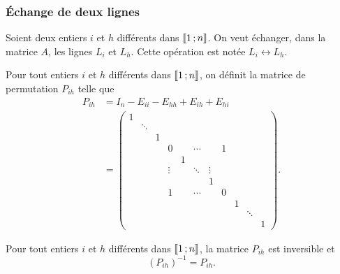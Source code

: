 \subsubsection{Échange de deux lignes}
Soient deux entiers \(i\) et \(h\) différents dans \(\mathopen{\llbracket}1\mathclose{}\mathpunct{};n\mathclose{\rrbracket}\).
On veut échanger, dans la matrice \(A\), les lignes \(L_i\) et \(L_h\). Cette
opération est notée \(L_i \leftrightarrow L_h\).
\begin{defdef}
  Pour tout entiers \(i\) et \(h\) différents dans \(\mathopen{\llbracket}1\mathclose{}\mathpunct{};n\mathclose{\rrbracket}\),
  on définit la matrice de permutation \(P_{ih}\) telle que
  \begin{align*}
    P_{ih} &= I_n - E_{ii}-E_{hh} +E_{ih}+E_{hi}\\
           & = 
           \begin{pmatrix}
             1&        &  &        &   &        &        &   &   &        & \\
              & \ddots &  &        &   &        &        &   &   &        & \\
              &        &1 &        &   &        &        &   &   &        & \\
              &        &  & 0      &   & \cdots &        & 1 &   &        & \\
              &        &  &        & 1 &        &        &   &   &        & \\
              &        &  & \vdots &   & \ddots & \vdots &   &   &        & \\
              &        &  &        &   &        & 1      &   &   &        & \\
              &        &  & 1      &   & \cdots &        & 0 &   &        & \\
              &        &  &        &   &        &        &   & 1 &        & \\
              &        &  &        &   &        &        &   &   & \ddots & \\
              &        &  &        &   &        &        &   &   &        & 1
           \end{pmatrix}.
  \end{align*}
\end{defdef}
%
\begin{prop}
  Pour tout entiers \(i\) et \(h\) différents dans \(\mathopen{\llbracket}1\mathclose{}\mathpunct{};n\mathclose{\rrbracket}\),
  la matrice \(P_{ih}\) est inversible et
  \begin{equation}
    (P_{ih})^{-1} = P_{ih}.
  \end{equation}
\end{prop}
